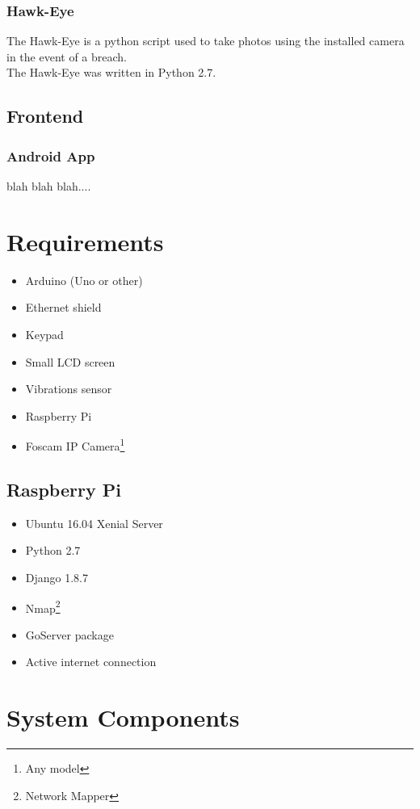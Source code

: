 \documentclass[10pt]{article}
\begin{document}
\quad \subsubsection*{Hawk-Eye}
\quad The Hawk-Eye is a python script used to take photos using the installed camera in the event of a breach. \\
\quad The Hawk-Eye was written in Python 2.7.


\subsection{Frontend}
\subsubsection{Android App}
blah blah blah....
\newpage
\section{Requirements}
\begin{itemize}
	\item Arduino (Uno or other)
	\item Ethernet shield
	\item Keypad
	\item Small LCD screen
	\item Vibrations sensor
	\item Raspberry Pi
	\item Foscam IP Camera\footnote{Any model}
\end{itemize}
\subsection{Raspberry Pi}
\begin{itemize}
	\item Ubuntu 16.04 Xenial Server
	\item Python 2.7	
	\item Django 1.8.7
	\item Nmap\footnote{Network Mapper}
	\item GoServer package
	\item Active internet connection
\end{itemize}

\section{System Components}
\end{document}
